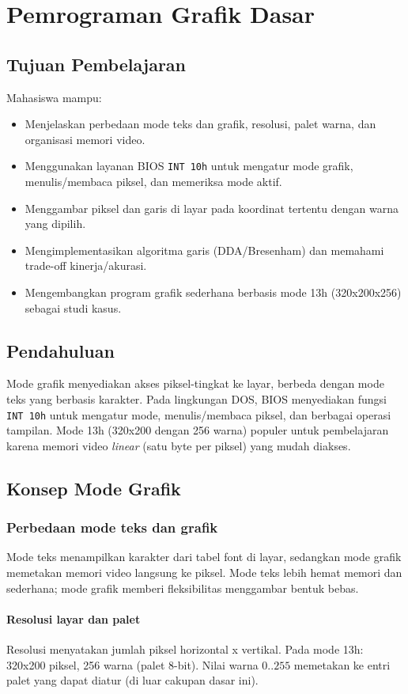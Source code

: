 \chapter{Pemrograman Grafik Dasar}

\section{Tujuan Pembelajaran}
Mahasiswa mampu:
\begin{itemize}
    \item Menjelaskan perbedaan mode teks dan grafik, resolusi, palet warna, dan organisasi memori video.
    \item Menggunakan layanan BIOS \texttt{INT 10h} untuk mengatur mode grafik, menulis/membaca piksel, dan memeriksa mode aktif.
    \item Menggambar piksel dan garis di layar pada koordinat tertentu dengan warna yang dipilih.
    \item Mengimplementasikan algoritma garis (DDA/Bresenham) dan memahami trade-off kinerja/akurasi.
    \item Mengembangkan program grafik sederhana berbasis mode 13h (320x200x256) sebagai studi kasus.
\end{itemize}

\section{Pendahuluan}
Mode grafik menyediakan akses piksel-tingkat ke layar, berbeda dengan mode teks yang berbasis karakter. Pada lingkungan DOS, BIOS menyediakan fungsi \texttt{INT 10h} untuk mengatur mode, menulis/membaca piksel, dan berbagai operasi tampilan. Mode 13h (320x200 dengan 256 warna) populer untuk pembelajaran karena memori video \textit{linear} (satu byte per piksel) yang mudah diakses.

\section{Konsep Mode Grafik}
\subsection{Perbedaan mode teks dan grafik}
Mode teks menampilkan karakter dari tabel font di layar, sedangkan mode grafik memetakan memori video langsung ke piksel. Mode teks lebih hemat memori dan sederhana; mode grafik memberi fleksibilitas menggambar bentuk bebas.

\subsubsection{Resolusi layar dan palet}
Resolusi menyatakan jumlah piksel horizontal x vertikal. Pada mode 13h: 320x200 piksel, 256 warna (palet 8-bit). Nilai warna \(0..255\) memetakan ke entri palet yang dapat diatur (di luar cakupan dasar ini).

